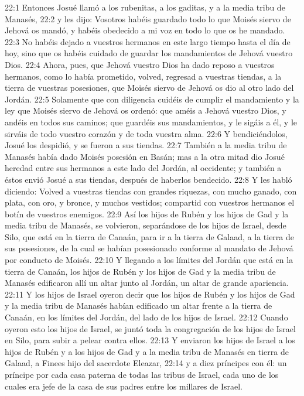 22:1 Entonces Josué llamó a los rubenitas, a los gaditas, y a la media tribu de Manasés,  
22:2 y les dijo: Vosotros habéis guardado todo lo que Moisés siervo de Jehová os mandó, y habéis obedecido a mi voz en todo lo que os he mandado. 
22:3 No habéis dejado a vuestros hermanos en este largo tiempo hasta el día de hoy, sino que os habéis cuidado de guardar los mandamientos de Jehová vuestro Dios.  
22:4 Ahora, pues, que Jehová vuestro Dios ha dado reposo a vuestros hermanos, como lo había prometido, volved, regresad a vuestras tiendas, a la tierra de vuestras posesiones, que Moisés siervo de Jehová os dio al otro lado del Jordán.  
22:5 Solamente que con diligencia cuidéis de cumplir el mandamiento y la ley que Moisés siervo de Jehová os ordenó: que améis a Jehová vuestro Dios, y andéis en todos sus caminos; que guardéis sus mandamientos, y le sigáis a él, y le sirváis de todo vuestro corazón y de toda vuestra alma.  
22:6 Y bendiciéndolos, Josué los despidió, y se fueron a sus tiendas.  
22:7 También a la media tribu de Manasés había dado Moisés posesión en Basán; mas a la otra mitad dio Josué heredad entre sus hermanos a este lado del Jordán, al occidente; y también a éstos envió Josué a sus tiendas, después de haberlos bendecido.  
22:8 Y les habló diciendo: Volved a vuestras tiendas con grandes riquezas, con mucho ganado, con plata, con oro, y bronce, y muchos vestidos; compartid con vuestros hermanos el botín de vuestros enemigos.  
22:9 Así los hijos de Rubén y los hijos de Gad y la media tribu de Manasés, se volvieron, separándose de los hijos de Israel, desde Silo, que está en la tierra de Canaán, para ir a la tierra de Galaad, a la tierra de sus posesiones, de la cual se habían posesionado conforme al mandato de Jehová por conducto de Moisés.  
22:10 Y llegando a los límites del Jordán que está en la tierra de Canaán, los hijos de Rubén y los hijos de Gad y la media tribu de Manasés edificaron allí un altar junto al Jordán, un altar de grande apariencia.  
22:11 Y los hijos de Israel oyeron decir que los hijos de Rubén y los hijos de Gad y la media tribu de Manasés habían edificado un altar frente a la tierra de Canaán, en los límites del Jordán, del lado de los hijos de Israel.  
22:12 Cuando oyeron esto los hijos de Israel, se juntó toda la congregación de los hijos de Israel en Silo, para subir a pelear contra ellos.  
22:13 Y enviaron los hijos de Israel a los hijos de Rubén y a los hijos de Gad y a la media tribu de Manasés en tierra de Galaad, a Finees hijo del sacerdote Eleazar,  
22:14 y a diez príncipes con él: un príncipe por cada casa paterna de todas las tribus de Israel, cada uno de los cuales era jefe de la casa de sus padres entre los millares de Israel.  
